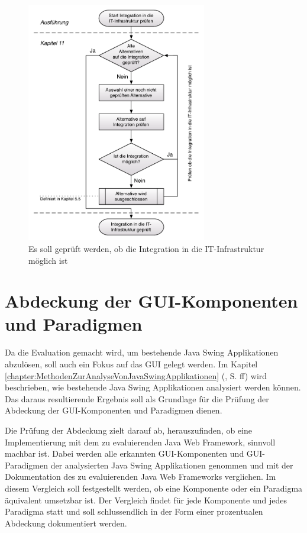   \clearpage
  
  \begin{figure}[h!]
    \begin{center}
      \includegraphics[width=0.7\textwidth]{./image/integrationPruefen.pdf}
      \caption{Es soll geprüft werden, ob die Integration in die
      IT-Infrastruktur möglich ist}
      \label{img:integrationPruefen}
    \end{center}
  \end{figure}
  
  \section{Abdeckung der GUI-Komponenten und Paradigmen}
  
  Da die Evaluation gemacht wird, um bestehende Java Swing Applikationen
  abzulösen, soll auch ein Fokus auf das \ac{GUI} gelegt werden. Im Kapitel
  \ref{chapter:MethodenZurAnalyseVonJavaSwingApplikationen}
  (, S.
  \pageref{chapter:MethodenZurAnalyseVonJavaSwingApplikationen}ff) wird
  beschrieben, wie bestehende Java Swing Applikationen analysiert werden
  können. Das daraus resultierende Ergebnis soll als Grundlage für die Prüfung
  der Abdeckung der GUI-Komponenten und Paradigmen dienen.
  
  Die Prüfung der Abdeckung zielt darauf ab, herauszufinden, ob eine
  Implementierung mit dem zu evaluierenden Java Web Framework, sinnvoll machbar
  ist. Dabei werden alle erkannten GUI-Komponenten und GUI-Paradigmen der
  analysierten Java Swing Applikationen genommen und mit der Dokumentation des
  zu evaluierenden Java Web Frameworks verglichen. Im diesem Vergleich soll
  festgestellt werden, ob eine Komponente oder ein Paradigma äquivalent
  umsetzbar ist. Der Vergleich findet für jede Komponente und jedes
  Paradigma statt und soll schlussendlich in der Form einer prozentualen
  Abdeckung dokumentiert werden.
  
